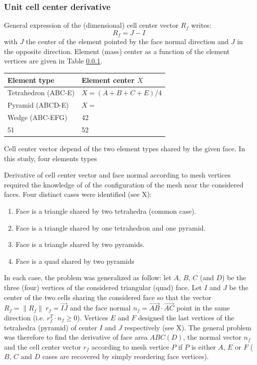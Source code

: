 \documentclass[11pt]{article}
\begin{document}
\subsubsection{Unit cell center derivative}

General expression of the (dimensional) cell center vector $R_f$ writes:
\begin{equation}
R_f = J-I
\end{equation}
with $J$ the center of the element pointed by the face normal direction and $J$ in the opposite direction.
Element (mass) center as a function of the element vertices are given in Table \ref{}.

\begin{table}
\begin{tabular}{|l|l|}
\hline
	Element type & Element center $X$\\ \hline
	Tetrahedron (ABC-E) & $X = (A+B+C+E)/4$\\ \hline
	Pyramid (ABCD-E) & $X = $\\
	Wedge (ABC-EFG) & 42\\
	51 & 52\\
\hline
\end{tabular}
\end{table}


Cell center vector depend of the two element types shared by the given face.
In this study, four elements types 

Derivative of cell center vector and face normal according to mesh vertices required the knowledge of of the configuration of the mesh near the considered faces. Four distinct cases were identified (see X):
\begin{enumerate}
  \item Face is a triangle shared by two tetrahedra (common case). 
  \item Face is a triangle shared by one tetrahedron and one pyramid.
  \item Face is a triangle shared by two pyramids.
  \item Face is a quad shared by two pyramids
\end{enumerate}

In each case, the problem was generalized as follow: let $A$, $B$, $C$ (and $D$) be the three (four) vertices of the considered triangular (quad) face. 
Let $I$ and $J$ be the center of the two cells sharing the considered face so that the vector $R_f=\|R_f\|\ r_f = \overrightarrow{IJ}$ and the face normal $n_f = \overrightarrow{AB} \cdot \overrightarrow{AC}$ point in the same direction (i.e. $r_f^T \cdot n_f \geq 0$).
Vertices $E$ and $F$ designed the last vertices of the tetrahedra (pyramid) of center $I$ and $J$ respectively (see X).
The general problem was therefore to find the derivative of face area $ABC(D)$, the normal vector $n_f$ and the cell center vector $r_f$ according to mesh vertice $P$ if $P$ is either $A$, $E$ or $F$ ($B$, $C$ and $D$ cases are recovered by simply reordering face vertices). 
\end{document}
